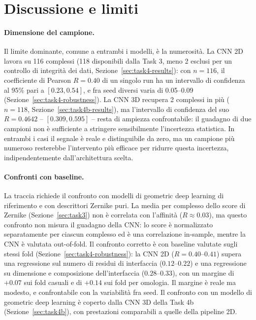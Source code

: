 \documentclass[11pt,a4paper]{article}
\begin{document}
\section{Discussione e limiti}
\label{sec:discussione}

\paragraph{Dimensione del campione.} Il limite dominante, comune a entrambi i modelli, è la numerosità. La CNN 2D lavora su 116 complessi (118 disponibili dalla Task 3, meno 2 esclusi per un controllo di integrità dei dati, Sezione~\ref{sec:task4-results}): con $n=116$, il coefficiente di Pearson $R=0.40$ di un singolo run ha un intervallo di confidenza al 95\% pari a $[0.23, 0.54]$, e fra seed diversi varia di 0.05--0.09 (Sezione~\ref{sec:task4-robustness}). La CNN 3D recupera 2 complessi in più ($n=118$, Sezione~\ref{sec:task4b-results}), ma l'intervallo di confidenza del suo $R=0.4642$ -- $[0.309, 0.595]$ -- resta di ampiezza confrontabile: il guadagno di due campioni non è sufficiente a stringere sensibilmente l'incertezza statistica. In entrambi i casi il segnale è reale e distinguibile da zero, ma un campione più numeroso resterebbe l'intervento più efficace per ridurre questa incertezza, indipendentemente dall'architettura scelta.

\paragraph{Confronti con baseline.} La traccia richiede il confronto con modelli di geometric deep learning di riferimento e con descrittori Zernike puri. La media per complesso dello score di Zernike (Sezione~\ref{sec:task3}) non è correlata con l'affinità ($R \approx 0.03$), ma questo confronto non misura il guadagno della CNN: lo score è normalizzato separatamente per ciascun complesso ed è una correlazione in-sample, mentre la CNN è valutata out-of-fold. Il confronto corretto è con baseline valutate sugli stessi fold (Sezione~\ref{sec:task4-robustness}): la CNN 2D ($R = 0.40$--$0.41$) supera una regressione sul numero di residui di interfaccia ($0.12$--$0.22$) e una regressione su dimensione e composizione dell'interfaccia ($0.28$--$0.33$), con un margine di $+0.07$ sui fold casuali e di $+0.14$ sui fold per omologia. Il margine è reale ma modesto, e confrontabile con la variabilità fra seed. Il confronto con un modello di geometric deep learning è coperto dalla CNN 3D della Task 4b (Sezione~\ref{sec:task4b}), con prestazioni comparabili a quelle della pipeline 2D.
\end{document}
